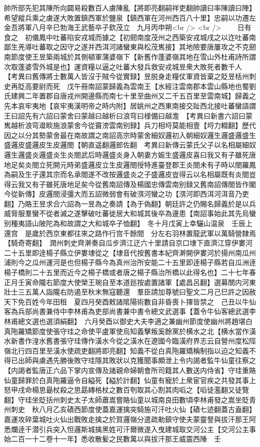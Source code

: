 帥所部先犯其陳所向闢易殺數百人虜陳亂【將即亮翻嗣祥吏翻帥讀曰率陳讀曰陣】希望縱兵乘之虜遂大敗置鎮西軍於鹽泉【鎮西軍在河州西百八十里】忠嗣以功遷左金吾將軍八月辛巳勃海王武藝卒子欽茂立　九月丙申朔<br />
<br />
　　日有食之　初儀鳳中吐蕃陷安戎城而據之【初劒南度茂州之西築安戎城戌之以迮吐蕃南鄙生羌導吐蕃取之因守之遂并西洱河諸蠻東與松茂嶲接】其地險要唐屢攻之不克劒南節度使王昱築兩城於其側頓軍蒲婆嶺下【新舊作蓬婆嶺其地在雪山外杜甫詩所謂次取蓬婆雪外城是也】運資糧以逼之吐蕃大發兵救安戎城昱衆大敗死者數千人　【考異曰舊傳將士數萬人皆沒于賊今從實録】昱脱身走糧仗軍資皆棄之貶昱栝州刺史再貶高要尉而死　戊午冊南詔蒙歸義為雲南王【水經注雲南郡本雲山縣地也蜀劉氏建興二年置郡自唐戎州開邊縣而南七十里至曲州又二千五百里至雲南城】歸義之先本哀牢夷地【哀牢夷漢明帝之時内附】居姚州之西東南接交趾西北接吐蕃蠻語謂王曰詔先有六詔曰蒙舍曰蒙越曰越析曰浪穹曰様備曰越澹　【考異曰新書六詔曰蒙嶲越析浪穹邆睒施浪蒙舍今從竇滂雲南别録】兵刀相埒莫能相壹【埒力輟翻】歷代因之以分其勢蒙舍最在南故謂之南詔高宗時蒙舍細奴邏初入朝細奴邏生邏盛邏盛生盛邏皮盛邏皮生皮邏閤【朝直遥翻邏郎佐翻　考異曰新傳云蒙氏父子以名相屬細奴邏生邏盛炎邏盛炎生炎閤武后時邏盛炎身入朝妻方娠生盛邏皮喜曰我又有子雖死唐地足矣炎閤立死開元時弟盛邏皮立生皮邏閤授特進臺登郡王炎閤未有子時以閤羅鳳為嗣及生子還其宗而名承閤遂不改按邏盛炎之子盛邏皮豈得云以名相屬既有炎閤豈得云我又有子雖死唐地足矣今從舊南詔傳及楊國忠傳雲南别録又舊南詔傳閤皆作閣今從新傳】皮邏閤浸彊大而五詔微弱會有破渳河蠻之功【渳河即西洱河洱音乃吏翻】乃賂王昱求合六詔為一昱為之奏請【為于偽翻】朝廷許之仍賜名歸義於是以兵威脅服羣蠻不從者滅之遂擊破吐蕃徙居大和城其後卒為邊患【南詔事始此其先烏蠻别種夷語山陂陀為和故謂之大和城卒子恤翻】　冬十月戊寅上幸驪山温泉　壬辰上還宫　是歲於西京東都往來之路作行宫千餘間　分左右羽林置龍武軍以萬騎營隸焉【騎奇寄翻】　潤州刺史齊澣奏自瓜步濟江迂六十里請自京口埭下直濟江穿伊婁河二十五里即逹楊子縣立伊婁埭從之【埭音代按舊書本紀齊澣開伊婁河於揚州南瓜州浦則今之瓜州運河是也但楊子縣今為真州治所安能二十五里即逹楊子縣若自瓜洲逹楊子橋則二十五里而近今之楊子橋或者唐之楊子縣治所橋以此得名也】二十七年春正月壬寅命隴右節度大使榮王琬自至本道廵按處置諸軍【處昌呂翻】選募關内河東壯士三五萬人詣隴右防遏至秋末無寇聽還　羣臣請加尊號曰聖文二月己巳許之因赦天下免百姓今年田租　夏四月癸酉敕諸隂陽術數自非昏喪卜擇皆禁之　己丑以牛仙客為兵部尚書兼侍中李林甫為吏部尚書兼中書令總文武選事【蓋令牛仙客總武選李林甫總文選也選須絹翻】　六月癸酉以御史大夫李適之兼幽州節度使幽州將趙堪白真陁羅矯節度使張守珪之命使平盧軍使烏知義擊叛奚餘黨於横水之北【横水當作潢水新書作湟水舊書張守珪傳作潢水今從之潢水在遼國今臨潢府界志云自營州度松陘嶺北行四百里至潢水使疏吏翻將即亮翻】知義不從白真陁羅矯稱制指以迫之知義不得已出師與虜遇先勝後敗守珪隱其敗狀以克獲聞事頗泄上令内謁者監牛仙童往察之【内謁者監唐正六品下掌内宣傳及諸親命婦朝會所司籍其人數送内侍省】守珪重賂仙童歸罪於白真陁羅逼令自縊死【縊於計翻】仙童有寵於上衆宦官疾之共發其事上怒甲戌命楊思朂杖殺之思勗縳格杖之數百刳取其心割其肉㗖之【㗖徒濫翻又徒覽翻】守珪坐貶括州刺史太子太師蕭嵩嘗賂仙童以城南良田數頃李林甫發之嵩坐貶青州刺史　秋八月乙亥磧西節度使蓋嘉運擒突騎施可汗吐火仙【磧七迹翻蓋古盍翻】嘉運攻碎葉城吐火仙出戰敗走擒之於賀邏嶺分遣疏勒鎮守使夫蒙靈詧與拔汗那王阿悉爛逹干潜引兵突入怛邏斯城擒黑姓可汗爾微遂入曳建城取交河公主【交河公主事始二百一十二卷十一年】悉收散髪之民數萬以與拔汗那王威震西陲　壬